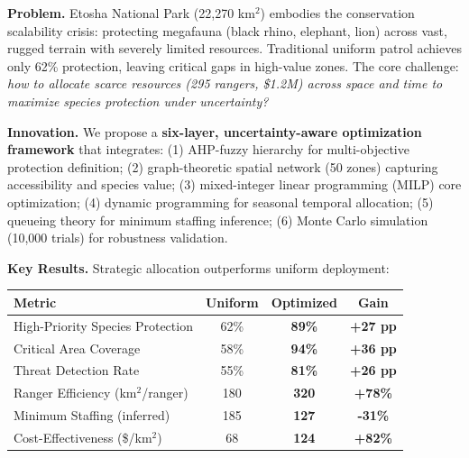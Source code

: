 
\textbf{Problem.}
Etosha National Park (22,270 km$^2$) embodies the conservation scalability crisis: protecting megafauna (black rhino, elephant, lion) across vast, rugged terrain with severely limited resources. Traditional uniform patrol achieves only 62\% protection, leaving critical gaps in high-value zones. The core challenge: \emph{how to allocate scarce resources (295 rangers, \$1.2M) across space and time to maximize species protection under uncertainty?}

\vspace{0.25cm}

\textbf{Innovation.}
We propose a \textbf{six-layer, uncertainty-aware optimization framework} that integrates:
(1) AHP-fuzzy hierarchy for multi-objective protection definition;
(2) graph-theoretic spatial network (50 zones) capturing accessibility and species value;
(3) mixed-integer linear programming (MILP) core optimization;
(4) dynamic programming for seasonal temporal allocation;
(5) queueing theory for minimum staffing inference;
(6) Monte Carlo simulation (10,000 trials) for robustness validation.

\vspace{0.25cm}

\textbf{Key Results.} Strategic allocation outperforms uniform deployment:

\begin{table}[H]
\centering
\small
\begin{tabular}{lccc}
\toprule
\textbf{Metric} & \textbf{Uniform} & \textbf{Optimized} & \textbf{Gain} \\
\midrule
High-Priority Species Protection & 62\% & \textbf{89\%} & \textbf{+27 pp} \\
Critical Area Coverage & 58\% & \textbf{94\%} & \textbf{+36 pp} \\
Threat Detection Rate & 55\% & \textbf{81\%} & \textbf{+26 pp} \\
Ranger Efficiency (km$^2$/ranger) & 180 & \textbf{320} & \textbf{+78\%} \\
Minimum Staffing (inferred) & 185 & \textbf{127} & \textbf{-31\%} \\
Cost-Effectiveness (\$/km$^2$) & 68 & \textbf{124} & \textbf{+82\%} \\
\bottomrule
\end{tabular}
\end{table}

